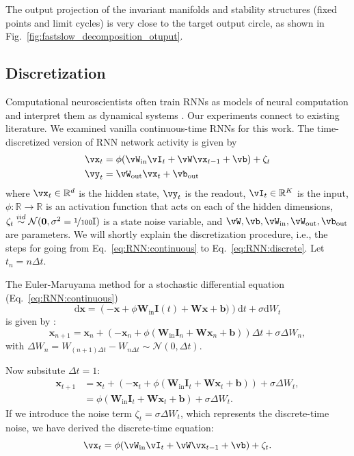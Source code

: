 \documentclass{article} %
\newcounter{ct}
\newcommand{\win}{\vW_{\text{in}}}
\newcommand{\wout}{\vW_{\text{out}}}
\newcommand{\bout}{\vb_{\text{out}}}
\newcommand{\reals}{\mathbb{R}}
\newcommand{\iidsample}{\stackrel{iid}{\sim}}
\newcommand{\identity}{\ensuremath{\mathbb{I}}}
\theoremstyle{definition}
\theoremstyle{remark}
\begin{document}
The output projection of the invariant manifolds and stability structures (fixed points and limit cycles) is very close to the target output circle, as shown in Fig.~\ref{fig:fastslow_decomposition_otuput}.



\subsection{Discretization}\label{sec:supp:discretization}


Computational neuroscientists often train RNNs as models of neural computation and interpret them as dynamical systems \citep{mante2013context,sussillo2013blackbox,xie2022neural}.
Our experiments connect to existing literature.
We examined vanilla continuous-time RNNs for this work.
The time-discretized version of RNN network activity is given by
\begin{equation}
  \begin{aligned}
	\vx_{t} &= \phi(\win \vI_{t} + \vW \vx_{t - 1} + \vb) + \zeta_{t} \label{eq:RNN:discrete}\\
	\vy_{t} &= \wout \vx_{t} + \bout
  \end{aligned}
\end{equation}where \(\vx_{t} \in \reals^{d}\) is the hidden state,
\(\vy_{t} \) is the readout,
\(\vI_{t} \in \reals^{K}\) is the input,
\(\phi\colon \reals \to \reals\) is an activation function that acts on each of the hidden dimensions,
 \(\zeta_{t}\iidsample\mathcal{N}(\mathbf{0},\sigma^{2} = \nicefrac{1}{100}\identity)\) is a state noise variable, and %
\(\vW, \vb, \win, \wout, \bout\) are parameters.
We will shortly explain the discretization procedure, i.e., the steps for going from Eq.~\ref{eq:RNN:continuous} to Eq.~\ref{eq:RNN:discrete}.
Let \(t_{n} = n \Delta t\).



The Euler-Maruyama method for a stochastic differential equation (Eq.~\ref{eq:RNN:continuous})
\[\mathrm{d}{\mathbf{x}} = \left(-\mathbf{x} + \phi\mathbf{W}_{\text{in}} \mathbf{I}(t) + \mathbf{W} \mathbf{x} + \mathbf{b})\right)\mathrm{d}{t} + \sigma\mathrm{d}{W}_{t}\] is given by :
\[\mathbf{x}_{n + 1} = \mathbf{x}_{n} + \left( -\mathbf{x}_{n} + \phi(\mathbf{W}_{\text{in}} \mathbf{I}_{n} + \mathbf{W} \mathbf{x}_{n} + \mathbf{b}) \right) \Delta t + \sigma \Delta W_{n},\]
with \(\Delta W_{n}=W_{(n + 1)\Delta t}-W_{n\Delta t}\sim \mathcal{N}(0,\Delta t).\)

Now subsitute \(\Delta t = 1\):
\begin{align}
 \mathbf{x}_{t + 1} &= \mathbf{x}_{t} + \left( -\mathbf{x}_{t} + \phi(\mathbf{W}_{\text{in}} \mathbf{I}_{t} + \mathbf{W} \mathbf{x}_{t} + \mathbf{b}) \right) + \sigma \Delta W_{t}, \\
 &= \phi(\mathbf{W}_{\text{in}} \mathbf{I}_{t} + \mathbf{W} \mathbf{x}_{t} + \mathbf{b}) + \sigma \Delta W_{t}.
 \end{align}
If we introduce the noise term \(\zeta_{t} = \sigma \Delta W_{t}\), which represents the discrete-time noise, we have derived the discrete-time equation: \[ \vx_{t} = \phi(\win \vI_{t} + \vW \vx_{t - 1} + \vb) + \zeta_{t}. \]
\end{document}
